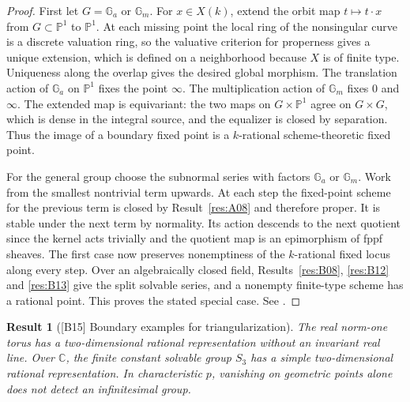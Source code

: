 \documentclass[11pt,a4paper,openany,oneside]{book}
\theoremstyle{resultstyle}
\newtheorem{statement}{Result}[chapter]
\newenvironment{result}[2]{\clubpenalty=10000\begin{statement}[\textnormal{[#1]} #2]\leavevmode\label{res:#1}\ignorespaces}{\end{statement}}
\theoremstyle{definition}
\numberwithin{equation}{chapter}
\begin{document}
\begin{proof}
First let \(G=\mathbb G_a\) or \(\mathbb G_m\).
For \(x\in X(k)\), extend the orbit map \(t\mapsto t\cdot x\)
from \(G\subset\mathbb P^1\) to \(\mathbb P^1\).
At each missing point the local ring of the nonsingular curve
is a discrete valuation ring, so the valuative criterion for
properness gives a unique extension, which is defined on
a neighborhood because \(X\) is of finite type.
Uniqueness along the overlap gives the desired global morphism.
The translation action of \(\mathbb G_a\) on \(\mathbb P^1\)
fixes the point \(\infty\). The multiplication action of
\(\mathbb G_m\) fixes \(0\) and \(\infty\).
The extended map is equivariant: the two maps on
\(G\times\mathbb P^1\) agree on \(G\times G\), which is dense in
the integral source, and the equalizer is closed by separation.
Thus the image of a boundary fixed point is a \(k\)-rational
scheme-theoretic fixed point.

For the general group choose the subnormal series with factors
\(\mathbb G_a\) or \(\mathbb G_m\). Work from the smallest
nontrivial term upwards. At each step the fixed-point scheme
for the previous term is closed by Result~\ref{res:A08} and
therefore proper. It is stable under the next term by normality.
Its action descends to the next quotient since the kernel acts
trivially and the quotient map is an epimorphism of fppf
sheaves. The first case now preserves nonemptiness of the
\(k\)-rational fixed locus along every step. Over an algebraically
closed field, Results~\ref{res:B08}, \ref{res:B12} and
\ref{res:B13} give the split solvable series, and a nonempty
finite-type scheme has a rational point. This proves the
stated special case. See \cite[Theorem 16.51 and Corollary 16.53]{milne}.
\end{proof}

\begin{result}{B15}{Boundary examples for triangularization}
The real norm-one torus has a two-dimensional rational
representation without an invariant real line. Over \(\mathbb C\),
the finite constant solvable group \(S_3\) has a simple
two-dimensional rational representation. In characteristic \(p\),
vanishing on geometric points alone does not detect an
infinitesimal group.
\end{result}
\end{document}
